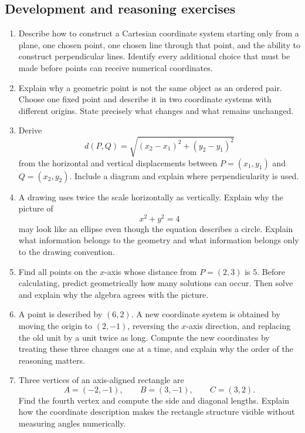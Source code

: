 \subsection{Development and reasoning exercises}

\begin{enumerate}

\item Describe how to construct a Cartesian coordinate system starting only from a
plane, one chosen point, one chosen line through that point, and the ability to
construct perpendicular lines. Identify every additional choice that must be
made before points can receive numerical coordinates.

\item Explain why a geometric point is not the same object as an ordered pair.
Choose one fixed point and describe it in two coordinate systems with different
origins. State precisely what changes and what remains unchanged.

\item Derive
\[
d(P,Q)=\sqrt{(x_2-x_1)^2+(y_2-y_1)^2}
\]
from the horizontal and vertical displacements between $P=(x_1,y_1)$ and
$Q=(x_2,y_2)$. Include a diagram and explain where perpendicularity is used.

\item A drawing uses twice the scale horizontally as vertically. Explain why the
picture of
\[
x^2+y^2=4
\]
may look like an ellipse even though the equation describes a circle. Explain
what information belongs to the geometry and what information belongs only to
the drawing convention.

\item Find all points on the $x$-axis whose distance from $P=(2,3)$ is $5$.
Before calculating, predict geometrically how many solutions can occur. Then
solve and explain why the algebra agrees with the picture.

\item A point is described by $(6,2)$. A new coordinate system is obtained by
moving the origin to $(2,-1)$, reversing the $x$-axis direction, and replacing
the old unit by a unit twice as long. Compute the new coordinates by treating
these three changes one at a time, and explain why the order of the reasoning
matters.

\item Three vertices of an axis-aligned rectangle are
\[
A=(-2,-1),\qquad B=(3,-1),\qquad C=(3,2).
\]
Find the fourth vertex and compute the side and diagonal lengths. Explain how
the coordinate description makes the rectangle structure visible without
measuring angles numerically.


\end{enumerate}

